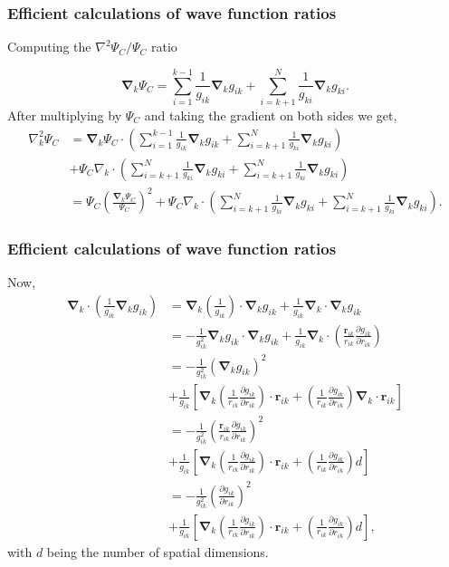 \documentclass[compress]{beamer}
\newcommand{\bfv}[1]{\boldsymbol{#1}}                     %
\begin{document}
\frame
 {
   \frametitle{Efficient calculations of wave function ratios}
 \begin{small}
 {\scriptsize

{Computing the $\nabla^2 \Psi_C/\Psi_C$ ratio}

\[\bfv{\nabla}_k \Psi_C = 
\sum_{i=1}^{k-1}\frac{1}{g_{ik}} \bfv{\nabla}_k g_{ik}
+
\sum_{i=k+1}^{N}\frac{1}{g_{ki}}\bfv{\nabla}_k g_{ki}.\]
After multiplying by $\Psi_C$ and taking the gradient on both sides we get,
\begin{align}\label{gradLap}
\nabla_{k}^2 \Psi_C & = \bfv{\nabla}_k \Psi_C \cdot 
\left(\sum_{i=1}^{k-1}\frac{1}{g_{ik}} \bfv{\nabla}_k g_{ik}
+
\sum_{i=k+1}^{N}\frac{1}{g_{ki}}\bfv{\nabla}_k g_{ki}\right)\nonumber\\
&+
\Psi_C \nabla_k \cdot \left(\sum_{i=k+1}^{N}\frac{1}{g_{ki}}\bfv{\nabla}_k g_{ki}
+
\sum_{i=k+1}^{N}\frac{1}{g_{ki}}\bfv{\nabla}_k g_{ki}\right)\nonumber\\
& = \Psi_C \left(\frac{\bfv{\nabla}_k \Psi_C}{\Psi_C}\right)^2 +
\Psi_C \nabla_k \cdot \left(\sum_{i=k+1}^{N}\frac{1}{g_{ki}}\bfv{\nabla}_k g_{ki}
+
\sum_{i=k+1}^{N}\frac{1}{g_{ki}}\bfv{\nabla}_k g_{ki}\right).
\end{align}
 }
 \end{small}
 }
\frame
 {
   \frametitle{Efficient calculations of wave function ratios}
 \begin{small}
 {\scriptsize

Now,
\begin{align}
 \bfv{\nabla}_k \cdot \left(\frac{1}{g_{ik}}\bfv{\nabla}_k g_{ik}\right) &= \bfv{\nabla}_k \left(\frac{1}{g_{ik}}\right)\cdot \bfv{\nabla}_k g_{ik} + \frac{1}{g_{ik}}\bfv{\nabla}_k \cdot \bfv{\nabla}_k g_{ik}\nonumber\\
 & = -\frac{1}{g_{ik}^2} \bfv{\nabla}_k g_{ik} \cdot \bfv{\nabla}_k g_{ik} + \frac{1}{g_{ik}} \bfv{\nabla}_k \cdot \left(\frac{\bfv{r}_{ik}}{r_{ik}}\frac{\partial g_{ik}}{\partial r_{ik}}\right)\nonumber\\
 & = -\frac{1}{g_{ik}^2} (\bfv{\nabla}_k g_{ik})^2 \nonumber\\&+ \frac{1}{g_{ik}}\left[\bfv{\nabla}_k \left(\frac{1}{r_{ik}}\frac{\partial g_{ik}}{\partial r_{ik}}\right)\cdot \bfv{r}_{ik} + \left(\frac{1}{r_{ik}}\frac{\partial g_{ik}}{\partial r_{ik}}\right) \bfv{\nabla}_k \cdot \bfv{r}_{ik}  \right] \nonumber\\
 &= -\frac{1}{g_{ik}^2} \left(\frac{\bfv{r}_{ik}}{r_{ik}}\frac{\partial g_{ik}}{\partial r_{ik}}\right)^2\nonumber\\ &+ \frac{1}{g_{ik}}\left[\bfv{\nabla}_k \left(\frac{1}{r_{ik}}\frac{\partial g_{ik}}{\partial r_{ik}}\right)\cdot \bfv{r}_{ik} + \left(\frac{1}{r_{ik}}\frac{\partial g_{ik}}{\partial r_{ik}}\right) d  \right]\nonumber\\
 &= -\frac{1}{g_{ik}^2} \left(\frac{\partial g_{ik}}{\partial r_{ik}}\right)^2\nonumber\\ &+ \frac{1}{g_{ik}}\left[\bfv{\nabla}_k \left(\frac{1}{r_{ik}}\frac{\partial g_{ik}}{\partial r_{ik}}\right)\cdot \bfv{r}_{ik} + \left(\frac{1}{r_{ik}}\frac{\partial g_{ik}}{\partial r_{ik}}\right) d  \right], \label{subs0}
 \end{align}
with $d$ being the number of spatial dimensions.
 }
 \end{small}
 }
\end{document}
